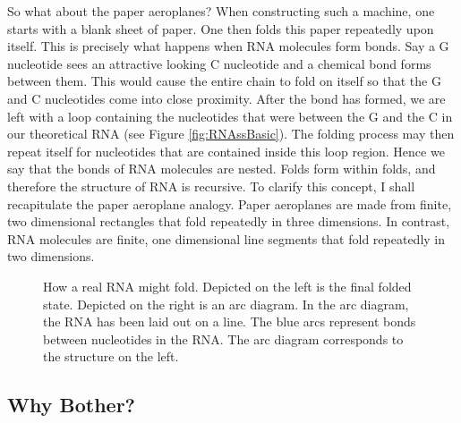 \documentclass[12pt, a4paper]{article}
\begin{document}
So what about the paper aeroplanes? When constructing such a machine, one starts with a blank sheet of paper. One then folds this paper repeatedly upon itself. This is precisely what happens when RNA molecules form bonds. Say a G nucleotide sees an attractive looking C nucleotide and a chemical bond forms between them. This would cause the entire chain to fold on itself so that the G and C nucleotides come into close proximity. After the bond has formed, we are left with a loop containing the nucleotides that were between the G and the C in our theoretical RNA (see Figure \ref{fig:RNAssBasic}). The folding process may then repeat itself for nucleotides that are contained inside this loop region. Hence we say that the bonds of RNA molecules are nested. Folds form within folds, and therefore the structure of RNA is recursive. To clarify this concept, I shall recapitulate the paper aeroplane analogy. Paper aeroplanes are made from finite, two dimensional rectangles that fold repeatedly in three dimensions. In contrast, RNA molecules are finite, one dimensional line segments that fold repeatedly in two dimensions.


\begin{figure}
\begin{center}
\end{center}
\caption{How a real RNA might fold. Depicted on the left is the final folded state. Depicted on the right is an arc diagram. In the arc diagram, the RNA has been laid out on a line. The blue arcs represent bonds between nucleotides in the RNA. The arc diagram corresponds to the structure on the left.}
\label{fig:RNAss}
\end{figure}

\subsection{Why Bother?}
\end{document}
